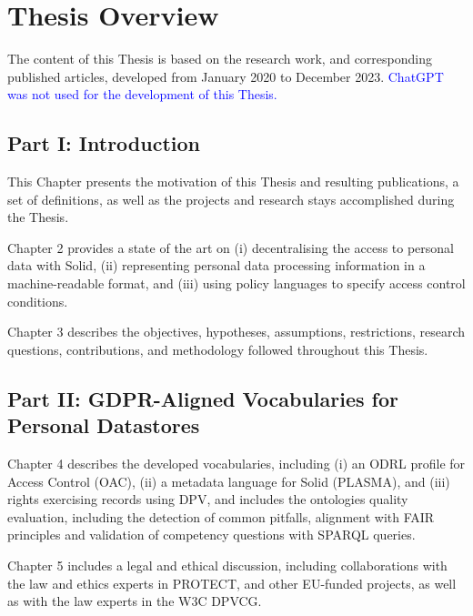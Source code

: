 \section{Thesis Overview}
\label{sec:thesis_overview}

The content of this Thesis is based on the research work, and corresponding published articles, developed from January 2020 to December 2023.
\textcolor{blue}{ChatGPT was not used for the development of this Thesis.}

\subsection*{Part I: Introduction}

This Chapter presents the motivation of this Thesis and resulting publications, a set of definitions, as well as the projects and research stays accomplished during the Thesis.

Chapter 2 provides a state of the art on (i) decentralising the access to personal data with Solid, (ii) representing personal data processing information in a machine-readable format, and (iii) using policy languages to specify access control conditions.

Chapter 3 describes the objectives, hypotheses, assumptions, restrictions, research questions, contributions, and methodology followed throughout this Thesis.

\subsection*{Part II: GDPR-Aligned Vocabularies for Personal Datastores}

Chapter 4 describes the developed vocabularies, including (i) an ODRL profile for Access Control (OAC), (ii) a metadata language for Solid (PLASMA), and (iii) rights exercising records using DPV, and includes the ontologies quality evaluation, including the detection of common pitfalls, alignment with FAIR principles and validation of competency questions with SPARQL queries.

Chapter 5 includes a legal and ethical discussion, including collaborations with the law and ethics experts in PROTECT, and other EU-funded projects, as well as with the law experts in the W3C DPVCG.

